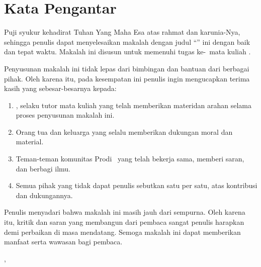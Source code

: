 \chapter*{Kata Pengantar}

Puji syukur kehadirat Tuhan Yang Maha Esa atas rahmat dan karunia-Nya, sehingga penulis dapat menyelesaikan makalah dengan judul ``\judul'' ini dengan baik dan tepat waktu. Makalah ini disusun untuk memenuhi tugas ke-\tugasKe\ mata kuliah \namaMataKuliah.

Penyusunan makalah ini tidak lepas dari bimbingan dan bantuan dari berbagai pihak. Oleh karena itu, pada kesempatan ini penulis ingin mengucapkan terima kasih yang sebesar-besarnya kepada:

\begin{enumerate}[]
    \item \namaTutorPengampu, selaku tutor mata kuliah \namaMataKuliah yang telah memberikan materidan arahan selama proses penyusunan makalah ini.
    \item Orang tua dan keluarga yang selalu memberikan dukungan moral dan material.
    \item Teman-teman komunitas Prodi \programStudi\  yang telah bekerja sama,  memberi saran, dan berbagi ilmu.
    \item Semua pihak yang tidak dapat penulis sebutkan satu per satu, atas kontribusi dan dukungannya.
\end{enumerate}

Penulis menyadari bahwa makalah ini masih jauh dari sempurna. Oleh karena itu, kritik dan saran yang membangun dari pembaca sangat penulis harapkan demi perbaikan di masa mendatang. Semoga makalah ini dapat memberikan manfaat serta wawasan bagi pembaca.

\vfill
\hfill \daearhMahasiswa, \tanggalLengkap


\hfill \namaMahasiswa
\vfill